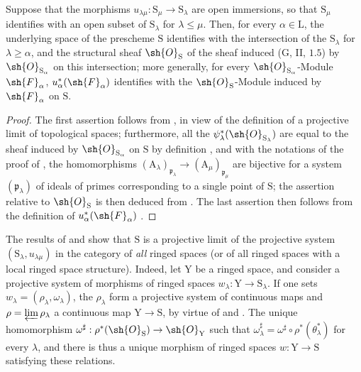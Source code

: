 \begin{proposition}[8.2.13]
\label{IV.8.2.13}
Suppose that the morphisms $u_{\lambda\mu}:\mathrm{S}_\mu\to\mathrm{S}_\lambda$ are open immersions, so that $\mathrm{S}_\mu$ identifies with an open subset of $\mathrm{S}_\lambda$ for $\lambda\leqslant\mu$.
Then, for every $\alpha\in\mathrm{L}$, the underlying space of the prescheme $\mathrm{S}$ identifies with the intersection of the $\mathrm{S}_\lambda$ for $\lambda\geqslant\alpha$, and the structural sheaf $\sh{O}_\mathrm{S}$ of the sheaf induced \textnormal{(}$\mathrm{G}$, II, $1.5$\textnormal{)} by $\sh{O}_{\mathrm{S}_\alpha}$ on this intersection; more generally, for every $\sh{O}_{\mathrm{S}_\alpha}$-Module $\sh{F}_\alpha$, $u_\alpha^*(\sh{F}_\alpha)$ identifies with the $\sh{O}_\mathrm{S}$-Module induced by $\sh{F}_\alpha$ on $\mathrm{S}$.
\end{proposition}

\begin{proof}
The first assertion follows from , in view of the definition of a projective limit of topological spaces; furthermore, all the $\psi_\lambda^*(\sh{O}_{\mathrm{S}_\lambda})$ are equal to the sheaf induced by $\sh{O}_{\mathrm{S}_\alpha}$ on $\mathrm{S}$ by definition , and with the notations of the proof of , the homomorphisms $(\mathrm{A}_\lambda)_{\mathfrak{p}_\lambda}\to(\mathrm{A}_\mu)_{\mathfrak{p}_\mu}$ are bijective for a system $(\mathfrak{p}_\lambda)$ of ideals of primes corresponding to a single point of $\mathrm{S}$; the assertion relative to $\sh{O}_\mathrm{S}$ is then deduced from .
The last assertion then follows from the definition of $u_\alpha^*(\sh{F}_\alpha)$ .
\end{proof}

\begin{remark}[8.2.14]
\label{IV.8.2.14}
The results of  and  show that $\mathrm{S}$ is a projective limit of the projective system $(\mathrm{S}_\lambda,u_{\lambda\mu})$ in the category of \emph{all} ringed spaces (or of all ringed spaces with a local ringed space structure).
Indeed, let $\mathrm{Y}$ be a ringed space, and consider a projective system of morphisms of ringed spaces $w_\lambda:\mathrm{Y}\to\mathrm{S}_\lambda$.
If one sets $w_\lambda=(\rho_\lambda,\omega_\lambda)$, the $\rho_\lambda$ form a projective system of continuous maps and $\rho=\varprojlim\rho_\lambda$ a continuous map $\mathrm{Y}\to\mathrm{S}$, by virtue of  and .
The unique homomorphism $\omega^\sharp:\rho^*(\sh{O}_\mathrm{S})\to\sh{O}_\mathrm{Y}$ such that $\omega_\lambda^\sharp=\omega^\sharp\circ\rho^*(\theta_\lambda^*)$ for every $\lambda$, and there is thus a unique morphism of ringed spaces $w:\mathrm{Y}\to\mathrm{S}$ satisfying these relations.
\end{remark}


